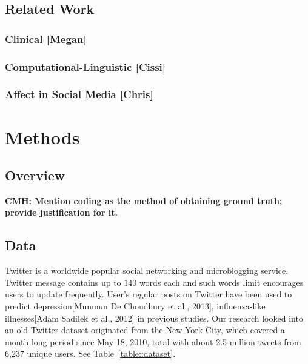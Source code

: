 \documentclass[11pt]{article}
\begin{document}
\subsection{Related Work}
\subsubsection{Clinical [Megan]}
\subsubsection{Computational-Linguistic [Cissi]}
\subsubsection{Affect in Social Media [Chris]}




\section{Methods}
\subsection{Overview}
\textbf{CMH: Mention coding as the method of obtaining ground truth; provide justification for it.}
\subsection{Data}
Twitter is a worldwide popular social networking and microblogging service. Twitter message contains up to 140 words each and such words limit encourages users to update frequently. User's regular posts on Twitter have been used to predict depression[Munmun De Choudhury et al., 2013], influenza-like illnesses[Adam Sadilek et al., 2012] in previous studies. Our research looked into an old Twitter dataset originated from the New York City, which covered a month long period since May 18, 2010, total with about 2.5 million tweets from 6,237 unique users. See Table~\ref{table::dataset}.
\end{document}
